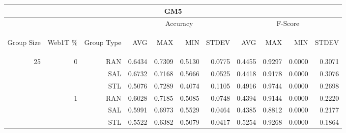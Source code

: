 \begin{center}
\begin{table}[htbp] 
 \begin{center}
\begin{tabular}{ | r | r | r | r | r | r | r | r | r | r | r |}
\hline
\multicolumn{11}{|c|}{GM5}\\
\hline
 & & & \multicolumn{4}{|c|}{Accuracy} & \multicolumn{4}{|c|}{F-Score}\\ \cline{4-11}
\begin{sideways}Group Size\end{sideways} & \begin{sideways}Web1T \%\end{sideways} & \begin{sideways}Group Type\end{sideways} & \begin{sideways}AVG\end{sideways} & \begin{sideways}MAX\end{sideways} & \begin{sideways}MIN\end{sideways} & \begin{sideways}STDEV\end{sideways} & \begin{sideways}AVG\end{sideways} & \begin{sideways}MAX\end{sideways} & \begin{sideways}MIN\end{sideways} & \begin{sideways}STDEV\end{sideways}\\
\hline
\multirow{18}{*}{25}
 & \multirow{3}{*}{0} & RAN & 0.6434 & 0.7309 & 0.5130 & 0.0775 & 0.4455 & 0.9297 & 0.0000 & 0.3071\\ \cline{3-11}
 &   & SAL & 0.6732 & 0.7168 & 0.5666 & 0.0525 & 0.4418 & 0.9178 & 0.0000 & 0.3076\\ \cline{3-11}
 &   & STL & 0.5076 & 0.7289 & 0.4074 & 0.1105 & 0.4916 & 0.9744 & 0.0000 & 0.2698\\ \cline{2-11}
 & \multirow{3}{*}{1} & RAN & 0.6028 & 0.7185 & 0.5085 & 0.0748 & 0.4394 & 0.9144 & 0.0000 & 0.2220\\ \cline{3-11}
 &   & SAL & 0.5991 & 0.6973 & 0.5529 & 0.0464 & 0.4385 & 0.8812 & 0.0000 & 0.2177\\ \cline{3-11}
 &   & STL & 0.5522 & 0.6382 & 0.5079 & 0.0417 & 0.5254 & 0.9268 & 0.0000 & 0.1864\\ \cline{2-11}

\end{tabular}
\end{center}
\end{table}
\end{center}
